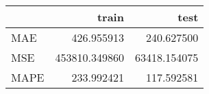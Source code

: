 \begin{tabular}{lrr}
\toprule
{} &          train &          test \\
\midrule
MAE  &     426.955913 &    240.627500 \\
MSE  &  453810.349860 &  63418.154075 \\
MAPE &     233.992421 &    117.592581 \\
\bottomrule
\end{tabular}
